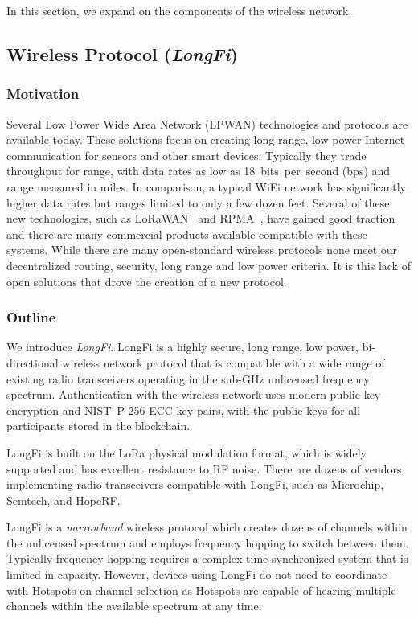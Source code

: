 \documentclass[10pt, nonatbib, nocopyrightspace, reprint]{sigplanconf}
\begin{document}
In this section, we expand on the components of the wireless network.

\subsection{Wireless Protocol (\emph{LongFi})}\label{longfi}

\subsubsection{Motivation}

Several Low Power Wide Area Network (LPWAN) technologies and protocols are available today. These solutions focus on creating long-range, low-power Internet communication for sensors and other smart devices. Typically they trade throughput for range, with data rates as low as 18~bits~per~second (bps) and range measured in miles. In comparison, a typical WiFi network has significantly higher data rates but ranges limited to only a few dozen feet. Several of these new technologies, such as LoRaWAN~\cite{lora} and RPMA~\cite{rpma}, have gained good traction and there are many commercial products available compatible with these systems. While there are many open-standard wireless protocols none meet our decentralized routing, security, long range and low power criteria. It is this lack of open solutions that drove the creation of a new protocol.

\subsubsection{Outline}

We introduce \emph{LongFi}. LongFi is a highly secure, long range, low power, bi-directional wireless network protocol that is compatible with a wide range of existing radio transceivers operating in the sub-GHz unlicensed frequency spectrum. Authentication with the wireless network uses modern public-key encryption and NIST~P-256 ECC key pairs, with the public keys for all participants stored in the blockchain.

LongFi is built on the LoRa physical modulation format, which is widely supported and has excellent resistance to RF noise. There are dozens of vendors implementing radio transceivers compatible with LongFi, such as Microchip, Semtech, and HopeRF.

LongFi is a \emph{narrowband} wireless protocol which creates dozens of channels within the unlicensed spectrum and employs frequency hopping to switch between them. Typically frequency hopping requires a complex time-synchronized system that is limited in capacity. However, devices using LongFi do not need to coordinate with Hotspots on channel selection as Hotspots are capable of hearing multiple channels within the available spectrum at any time.
\end{document}
